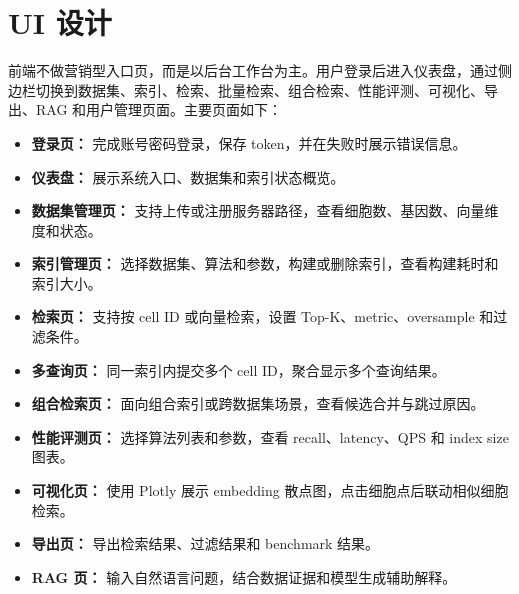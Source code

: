 \documentclass[UTF8,a4paper,12pt]{ctexrep}
\begin{document}
\section{UI 设计}

前端不做营销型入口页，而是以后台工作台为主。用户登录后进入仪表盘，通过侧边栏切换到数据集、索引、检索、批量检索、组合检索、性能评测、可视化、导出、RAG 和用户管理页面。主要页面如下：

\begin{itemize}
  \item \textbf{登录页：} 完成账号密码登录，保存 token，并在失败时展示错误信息。
  \item \textbf{仪表盘：} 展示系统入口、数据集和索引状态概览。
  \item \textbf{数据集管理页：} 支持上传或注册服务器路径，查看细胞数、基因数、向量维度和状态。
  \item \textbf{索引管理页：} 选择数据集、算法和参数，构建或删除索引，查看构建耗时和索引大小。
  \item \textbf{检索页：} 支持按 cell ID 或向量检索，设置 Top-K、metric、oversample 和过滤条件。
  \item \textbf{多查询页：} 同一索引内提交多个 cell ID，聚合显示多个查询结果。
  \item \textbf{组合检索页：} 面向组合索引或跨数据集场景，查看候选合并与跳过原因。
  \item \textbf{性能评测页：} 选择算法列表和参数，查看 recall、latency、QPS 和 index size 图表。
  \item \textbf{可视化页：} 使用 Plotly 展示 embedding 散点图，点击细胞点后联动相似细胞检索。
  \item \textbf{导出页：} 导出检索结果、过滤结果和 benchmark 结果。
  \item \textbf{RAG 页：} 输入自然语言问题，结合数据证据和模型生成辅助解释。
\end{itemize}
\end{document}
